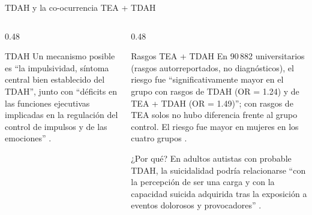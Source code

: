 \begin{frame}{TDAH y la co-ocurrencia TEA + TDAH}
\begin{columns}[T,onlytextwidth]
\begin{column}{0.48\textwidth}
\begin{block}{TDAH}
        \vspace{0.15cm}
        Un mecanismo posible es \enquote{la impulsividad, síntoma central bien
        establecido del TDAH}, junto con \enquote{déficits en las funciones
        ejecutivas implicadas en la regulación del control de impulsos y de las
        emociones} \citep{sun2024}.
      \end{block}
    \end{column}
    \begin{column}{0.48\textwidth}
      \begin{block}{Rasgos TEA + TDAH}
        \scriptsize
        En 90\,882 universitarios (rasgos autorreportados, no diagnósticos), el
        riesgo fue \enquote{significativamente mayor en el grupo con rasgos de
        TDAH (OR = 1.24) y de TEA + TDAH (OR = 1.49)}; con rasgos de TEA solos
        no hubo diferencia frente al grupo control. El riesgo fue mayor en
        mujeres en los cuatro grupos \citep{sun2024}.
      \end{block}
      \begin{block}{¿Por qué?}
        \scriptsize
        En adultos autistas con probable TDAH, la suicidalidad podría
        relacionarse \enquote{con la percepción de ser una carga y con la
        capacidad suicida adquirida tras la exposición a eventos dolorosos y
        provocadores} \citep{moseley2024}.
      \end{block}
    \end{column}
  \end{columns}
\end{frame}

